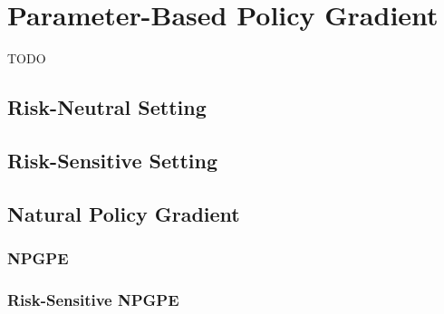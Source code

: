 \section{Parameter-Based Policy Gradient}
TODO

\subsection{Risk-Neutral Setting}

\subsection{Risk-Sensitive Setting}

\subsection{Natural Policy Gradient}

\subsubsection{NPGPE}

\subsubsection{Risk-Sensitive NPGPE}